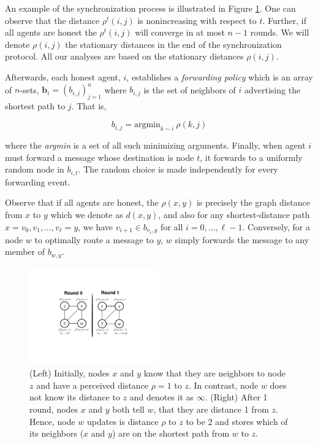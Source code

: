 \documentclass{comnet}
\begin{document}
An example of the synchronization process is illustrated in Figure
\ref{fig:synchronization}. One can observe that the distance $\rho^t(i,j)$ is
nonincreasing with respect to $t$. Further, if all agents are honest the
$\rho^t(i,j)$ will converge in at most $n-1$ rounds. We will denote $\rho(i,j)$
the stationary distances in the end of the synchronization protocol. All our
analyses are based on the stationary distances $\rho(i,j)$.

Afterwards, each honest agent, $i$, establishes a {\it forwarding policy} which
is an array of $n$-sets, $\mathbf{b}_{i} = (b_{i,j})_{j=1}^n$ where $b_{i,j}$
is the set of neighbors of $i$ advertising the shortest path to $j$. That is,

\begin{equation}
{b}_{i, j} =  \text{argmin}_{k \sim i} ~ \rho(k,j) \label {uniformb} 
\end{equation}

where the {\it argmin} is a set of all such minimizing arguments. Finally, when
agent $i$ must forward a message whose destination is node $t$, it forwards to
a uniformly random node in $b_{i,t}$. The random choice is made independently
for every forwarding event.

Observe that if all agents are honest, the $\rho(x,y)$ is precisely the graph
distance from $x$ to $y$ which we denote as $d(x,y)$, and also for any
shortest-distance path $x= v_0, v_1, \ldots, v_{\ell} =  y$, we have $v_{i+1}
\in b_{v_i,y}$ for all $i=0, \ldots, \ell-1$. Conversely, for a node $w$ to
optimally route a message to $y$, $w$ simply forwards the message to any member
of $b_{w,y}$.

\begin{figure}
\centering
\includegraphics[width=0.5\textwidth]{images/BGPSync}
\caption{(Left) Initially, nodes $x$ and $y$ know that they are neighbors to
node $z$ and have a perceived distance $\rho = 1$ to $z$. In contrast, node $w$
does not know its distance to $z$ and denotes it as $\infty$. (Right) After 1
round, nodes $x$ and $y$ both tell $w$, that they are distance 1 from $z$.
Hence, node $w$ updates is distance $\rho$ to $z$ to be 2 and stores which of
its neighbors ($x$ and $y$) are on the shortest path from $w$ to $z$.}
\label{fig:synchronization}
\end{figure}
\end{document}
